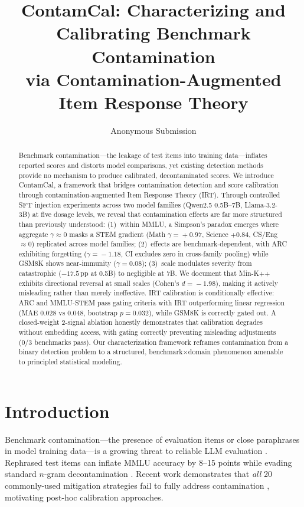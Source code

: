 \documentclass[11pt,a4paper]{article}
\title{ContamCal: Characterizing and Calibrating Benchmark Contamination\\via Contamination-Augmented Item Response Theory}
\author{
  Anonymous Submission
}
\newcommand{\pp}{\,\text{pp}}
\begin{document}
\maketitle

\begin{abstract}
Benchmark contamination---the leakage of test items into training data---inflates reported scores and distorts model comparisons, yet existing detection methods provide no mechanism to produce calibrated, decontaminated scores. We introduce ContamCal, a framework that bridges contamination detection and score calibration through contamination-augmented Item Response Theory (IRT). Through controlled SFT injection experiments across two model families (Qwen2.5 0.5B--7B, Llama-3.2-3B) at five dosage levels, we reveal that contamination effects are far more structured than previously understood: (1)~within MMLU, a Simpson's paradox emerges where aggregate $\gamma\!\approx\!0$ masks a STEM gradient (Math $\gamma\!=\!+0.97$, Science $+0.84$, CS/Eng~$\approx 0$) replicated across model families; (2)~effects are benchmark-dependent, with ARC exhibiting forgetting ($\gamma\!=\!-1.18$, CI excludes zero in cross-family pooling) while GSM8K shows near-immunity ($\gamma\!=\!0.08$); (3)~scale modulates severity from catastrophic ($-17.5\pp$ at 0.5B) to negligible at 7B. We document that Min-K++ exhibits directional reversal at small scales (Cohen's $d\!=\!-1.98$), making it actively misleading rather than merely ineffective. IRT calibration is conditionally effective: ARC and MMLU-STEM pass gating criteria with IRT outperforming linear regression (MAE $0.028$ vs $0.048$, bootstrap $p\!=\!0.032$), while GSM8K is correctly gated out. A closed-weight 2-signal ablation honestly demonstrates that calibration degrades without embedding access, with gating correctly preventing misleading adjustments (0/3 benchmarks pass). Our characterization framework reframes contamination from a binary detection problem to a structured, benchmark$\times$domain phenomenon amenable to principled statistical modeling.
\end{abstract}

\section{Introduction}

Benchmark contamination---the presence of evaluation items or close paraphrases in model training data---is a growing threat to reliable LLM evaluation \cite{sainz2023nlp,jacovi2023stop,balloccu2024leak}. Rephrased test items can inflate MMLU accuracy by 8--15 points while evading standard $n$-gram decontamination \cite{yang2023rethinking,golchin2024time}. Recent work demonstrates that \emph{all} 20 commonly-used mitigation strategies fail to fully address contamination \cite{dong2025emperor}, motivating post-hoc calibration approaches.
\end{document}
